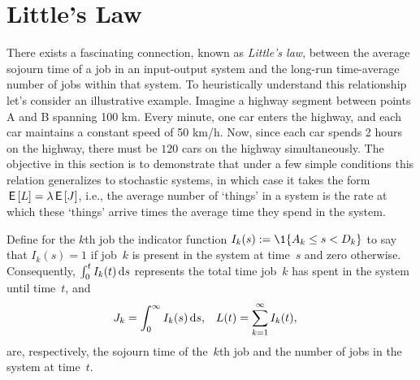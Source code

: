 \documentclass[stochastic-or.tex]{subfiles}
\begin{document}
\section{Little's Law}
\label{sec:littles-law}

There exists a fascinating connection, known as \emph{Little's law}, between the average sojourn time of a job in an input-output system and the long-run time-average number of jobs within that system.
To heuristically understand this relationship let's consider an illustrative example.
Imagine a highway segment between points A and B spanning 100 km.
Every minute, one car enters the highway, and each car maintains a constant speed of 50 km/h.
Now, since each car spends 2 hours on the highway, there must be $120$ cars
on the highway simultaneously.
The objective in this section is to demonstrate that under a few simple conditions this relation generalizes to stochastic systems, in which case it takes the form $\,\mathsf{E}\left[L\right] = \lambda \,\mathsf{E}\left[J\right]$, i.e., the average number of `things' in a system is the rate at which these `things' arrive times the average time they spend in the system.


Define for the $k$th job the indicator function $I_k(s) := \1{A_{k}\leq s < D_{k}}$ to say that $I_{k}(s) =1$ if job~$k$ is present in the system at time~$s$ and zero otherwise.
Consequently, $\int_{0}^{t} I_k(t) \,\textrm{d}s$ represents the total time job~$k$ has spent in the system until time~$t$, and
\begin{align*}
J_k &= \int_0^\infty I_k(s)\,\textrm{d}s, &  L(t) &= \sum_{k=1}^\infty I_k(t),
\end{align*}
are, respectively,  the sojourn time of the~$k$th job and the number of jobs in the system at time~$t$.
\end{document}

